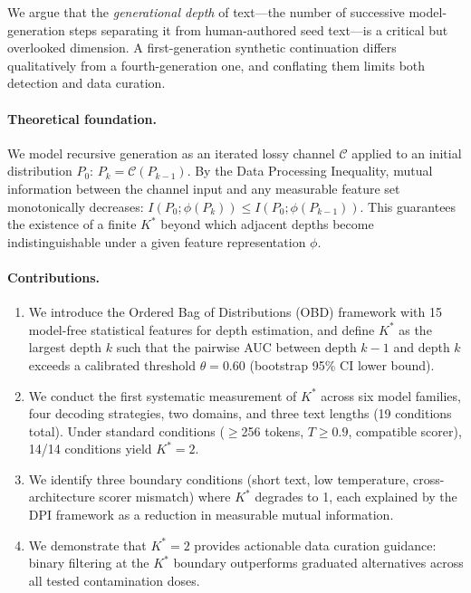 \documentclass[11pt]{article}
\newcommand{\kstar}{K^{*}}
\newcommand{\thetaval}{\theta}
\begin{document}
We argue that the \emph{generational depth} of text---the number of successive model-generation steps separating it from human-authored seed text---is a critical but overlooked dimension. A first-generation synthetic continuation differs qualitatively from a fourth-generation one, and conflating them limits both detection and data curation.

\paragraph{Theoretical foundation.} We model recursive generation as an iterated lossy channel $\mathcal{C}$ applied to an initial distribution $P_0$: $P_k = \mathcal{C}(P_{k-1})$. By the Data Processing Inequality, mutual information between the channel input and any measurable feature set monotonically decreases: $I(P_0; \phi(P_k)) \leq I(P_0; \phi(P_{k-1}))$. This guarantees the existence of a finite $\kstar$ beyond which adjacent depths become indistinguishable under a given feature representation $\phi$.

\paragraph{Contributions.}
\begin{enumerate}
  \item We introduce the Ordered Bag of Distributions (OBD) framework with 15 model-free statistical features for depth estimation, and define $\kstar$ as the largest depth $k$ such that the pairwise AUC between depth $k{-}1$ and depth $k$ exceeds a calibrated threshold $\thetaval = 0.60$ (bootstrap 95\% CI lower bound).
  \item We conduct the first systematic measurement of $\kstar$ across six model families, four decoding strategies, two domains, and three text lengths (19 conditions total). Under standard conditions ($\geq$256 tokens, $T \geq 0.9$, compatible scorer), 14/14 conditions yield $\kstar = 2$.
  \item We identify three boundary conditions (short text, low temperature, cross-architecture scorer mismatch) where $\kstar$ degrades to 1, each explained by the DPI framework as a reduction in measurable mutual information.
  \item We demonstrate that $\kstar = 2$ provides actionable data curation guidance: binary filtering at the $\kstar$ boundary outperforms graduated alternatives across all tested contamination doses.
\end{enumerate}
\end{document}

